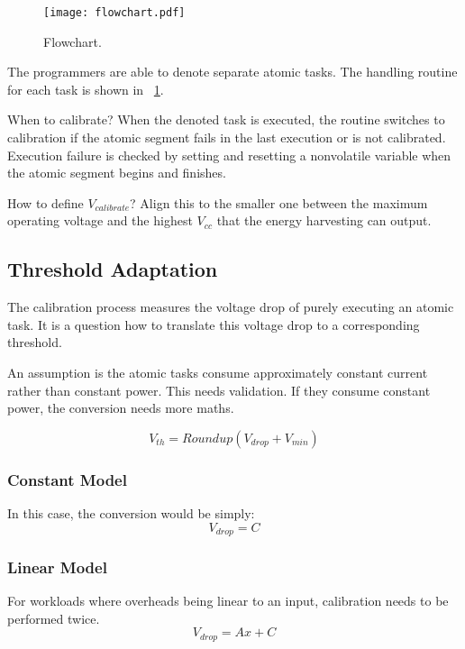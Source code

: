 \begin{figure}[!h]
    \centering
    \texttt{[image: flowchart.pdf]}
    \caption{Flowchart.}
    \label{fig:flowchart}
\end{figure}

The programmers are able to denote separate atomic tasks. 
The handling routine for each task is shown in \figurename{~\ref{fig:flowchart}}. 

When to calibrate? 
When the denoted task is executed, the routine switches to calibration if the atomic segment fails in the last execution or is not calibrated. 
Execution failure is checked by setting and resetting a nonvolatile variable when the atomic segment begins and finishes.

How to define $V_{calibrate}$? 
Align this to the smaller one between the maximum operating voltage and the highest $V_{cc}$ that the energy harvesting can output. 

\subsection{Threshold Adaptation}

The calibration process measures the voltage drop of purely executing an atomic task. It is a question how to translate this voltage drop to a corresponding threshold. 

An assumption is the atomic tasks consume approximately constant current rather than constant power. This needs validation. If they consume constant power, the conversion needs more maths. 

\begin{equation}
    V_{th} = Roundup(V_{drop} + V_{min})
    \label{eq:vth}
\end{equation}

\subsubsection{Constant Model}

In this case, the conversion would be simply:
\begin{equation}
    V_{drop} = C
\end{equation}


\subsubsection{Linear Model}

For workloads where overheads being linear to an input, calibration needs to be performed twice. 
\begin{equation}
    V_{drop} = Ax + C
\end{equation}
